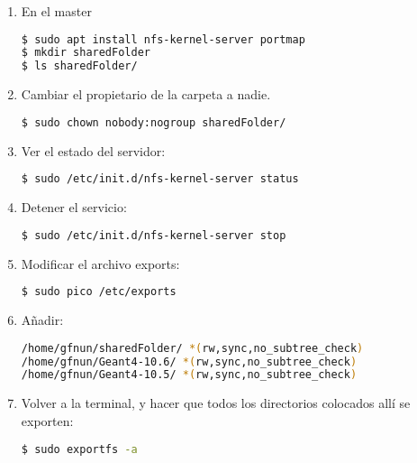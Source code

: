 \begin{enumerate}

    \item En el master
    
\begin{lstlisting}[language=bash,style=mystyle] 
$ sudo apt install nfs-kernel-server portmap
$ mkdir sharedFolder
$ ls sharedFolder/ 
\end{lstlisting}

    \item Cambiar el propietario de la carpeta a nadie.
    
\begin{lstlisting}[language=bash,style=mystyle]    
$ sudo chown nobody:nogroup sharedFolder/
\end{lstlisting} 


    \item Ver el estado del servidor:
    
\begin{lstlisting}[language=bash,style=mystyle]    
$ sudo /etc/init.d/nfs-kernel-server status
\end{lstlisting} 


    \item Detener el servicio:
    
\begin{lstlisting}[language=bash,style=mystyle]    
$ sudo /etc/init.d/nfs-kernel-server stop
\end{lstlisting} 


    \item Modificar el archivo exports:
    
\begin{lstlisting}[language=bash,style=mystyle]    
$ sudo pico /etc/exports
\end{lstlisting} 


    \item Añadir:
    
\begin{lstlisting}[language=bash,style=mystyle]    
/home/gfnun/sharedFolder/ *(rw,sync,no_subtree_check)
/home/gfnun/Geant4-10.6/ *(rw,sync,no_subtree_check)
/home/gfnun/Geant4-10.5/ *(rw,sync,no_subtree_check)
\end{lstlisting} 



    \item Volver a la terminal, y hacer que todos los directorios colocados allí se exporten:
    
\begin{lstlisting}[language=bash,style=mystyle]    
$ sudo exportfs -a
\end{lstlisting} 



\end{enumerate}

